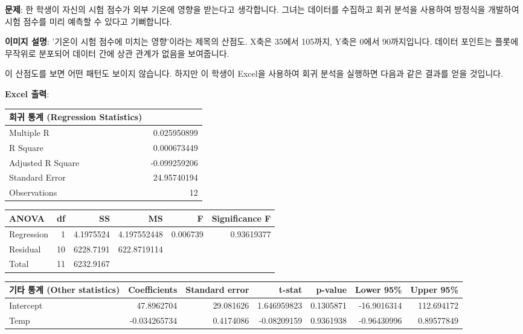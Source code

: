 \documentclass[11pt,a4paper]{article}
\theoremstyle{definition}
\begin{document}
\begin{tcolorbox}[examplebox, title=예시: 기온이 시험 점수에 미치는 영향]
\textbf{문제}: 한 학생이 자신의 시험 점수가 외부 기온에 영향을 받는다고 생각합니다. 그녀는 데이터를 수집하고 회귀 분석을 사용하여 방정식을 개발하여 시험 점수를 미리 예측할 수 있다고 기뻐합니다.

\begin{center}
\end{center}
\textbf{이미지 설명}: '기온이 시험 점수에 미치는 영향'이라는 제목의 산점도. X축은 35에서 105까지, Y축은 0에서 90까지입니다. 데이터 포인트는 플롯에 무작위로 분포되어 데이터 간에 상관 관계가 없음을 보여줍니다.

이 산점도를 보면 어떤 패턴도 보이지 않습니다. 하지만 이 학생이 Excel을 사용하여 회귀 분석을 실행하면 다음과 같은 결과를 얻을 것입니다.

\textbf{Excel 출력}:
\begin{adjustbox}{max width=\textwidth}
\begin{tabular}{lr}
\toprule
\textbf{회귀 통계 (Regression Statistics)} & \\
\midrule
Multiple R & 0.025950899 \\
R Square & 0.000673449 \\
Adjusted R Square & -0.099259206 \\
Standard Error & 24.95740194 \\
Observations & 12 \\
\bottomrule
\end{tabular}
\end{adjustbox}

\begin{adjustbox}{max width=\textwidth}
\begin{tabular}{lrrrrr}
\toprule
\textbf{ANOVA} & \textbf{df} & \textbf{SS} & \textbf{MS} & \textbf{F} & \textbf{Significance F} \\
\midrule
Regression & 1 & 4.1975524 & 4.197552448 & 0.006739 & 0.93619377 \\
Residual & 10 & 6228.7191 & 622.8719114 & & \\
Total & 11 & 6232.9167 & & & \\
\bottomrule
\end{tabular}
\end{adjustbox}

\begin{adjustbox}{max width=\textwidth}
\begin{tabular}{lrrrrrr}
\toprule
\textbf{기타 통계 (Other statistics)} & \textbf{Coefficients} & \textbf{Standard error} & \textbf{t-stat} & \textbf{p-value} & \textbf{Lower 95\%} & \textbf{Upper 95\%} \\
\midrule
Intercept & 47.8962704 & 29.081626 & 1.646959823 & 0.1305871 & -16.9016314 & 112.694172 \\
Temp & -0.034265734 & 0.4174086 & -0.08209159 & 0.9361938 & -0.96430996 & 0.89577849 \\
\bottomrule
\end{tabular}
\end{adjustbox}


\end{tcolorbox}
\end{document}
